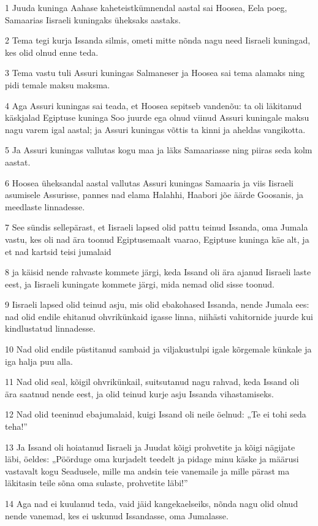 \par 1 Juuda kuninga Aahase kaheteistkümnendal aastal sai Hoosea, Eela poeg, Samaarias Iisraeli kuningaks üheksaks aastaks.
\par 2 Tema tegi kurja Issanda silmis, ometi mitte nõnda nagu need Iisraeli kuningad, kes olid olnud enne teda.
\par 3 Tema vastu tuli Assuri kuningas Salmaneser ja Hoosea sai tema alamaks ning pidi temale maksu maksma.
\par 4 Aga Assuri kuningas sai teada, et Hoosea sepitseb vandenõu: ta oli läkitanud käskjalad Egiptuse kuninga Soo juurde ega olnud viinud Assuri kuningale maksu nagu varem igal aastal; ja Assuri kuningas võttis ta kinni ja aheldas vangikotta.
\par 5 Ja Assuri kuningas vallutas kogu maa ja läks Samaariasse ning piiras seda kolm aastat.
\par 6 Hoosea üheksandal aastal vallutas Assuri kuningas Samaaria ja viis Iisraeli asumisele Assurisse, pannes nad elama Halahhi, Haabori jõe äärde Goosanis, ja meedlaste linnadesse.
\par 7 See sündis sellepärast, et Iisraeli lapsed olid pattu teinud Issanda, oma Jumala vastu, kes oli nad ära toonud Egiptusemaalt vaarao, Egiptuse kuninga käe alt, ja et nad kartsid teisi jumalaid
\par 8 ja käisid nende rahvaste kommete järgi, keda Issand oli ära ajanud Iisraeli laste eest, ja Iisraeli kuningate kommete järgi, mida nemad olid sisse toonud.
\par 9 Iisraeli lapsed olid teinud asju, mis olid ebakohased Issanda, nende Jumala ees: nad olid endile ehitanud ohvrikünkaid igasse linna, niihästi vahitornide juurde kui kindlustatud linnadesse.
\par 10 Nad olid endile püstitanud sambaid ja viljakustulpi igale kõrgemale künkale ja iga halja puu alla.
\par 11 Nad olid seal, kõigil ohvrikünkail, suitsutanud nagu rahvad, keda Issand oli ära saatnud nende eest, ja olid teinud kurje asju Issanda vihastamiseks.
\par 12 Nad olid teeninud ebajumalaid, kuigi Issand oli neile öelnud: „Te ei tohi seda teha!”
\par 13 Ja Issand oli hoiatanud Iisraeli ja Juudat kõigi prohvetite ja kõigi nägijate läbi, öeldes: „Pöörduge oma kurjadelt teedelt ja pidage minu käske ja määrusi vastavalt kogu Seadusele, mille ma andsin teie vanemaile ja mille pärast ma läkitasin teile sõna oma sulaste, prohvetite läbi!”
\par 14 Aga nad ei kuulanud teda, vaid jäid kangekaelseiks, nõnda nagu olid olnud nende vanemad, kes ei uskunud Issandasse, oma Jumalasse.
